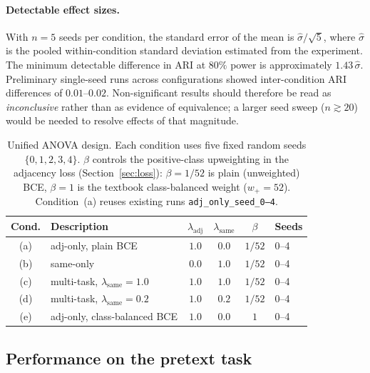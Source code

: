 \documentclass[12pt, a4paper]{article}
\begin{document}
\paragraph{Detectable effect sizes.}
With $n = 5$ seeds per condition, the standard error of the mean is
$\hat{\sigma}/\!\sqrt{5}$, where $\hat{\sigma}$ is the pooled within-condition
standard deviation estimated from the experiment.
The minimum detectable difference in ARI at $80\%$ power is approximately
$1.43\,\hat{\sigma}$.
Preliminary single-seed runs across configurations showed inter-condition
ARI differences of $0.01$--$0.02$. Non-significant results should therefore
be read as \emph{inconclusive} rather than as evidence of equivalence; a
larger seed sweep ($n \gtrsim 20$) would be needed to resolve effects of
that magnitude.

\begin{table}[h]
\centering
\begin{tabular}{clcccl}
\toprule
\textbf{Cond.} & \textbf{Description} & $\lambda_{\text{adj}}$ & $\lambda_{\text{same}}$ & $\beta$ & \textbf{Seeds} \\
\midrule
(a) & adj-only, plain BCE                      & $1.0$ & $0.0$ & $1/52$ & 0--4 \\
(b) & same-only                                & $0.0$ & $1.0$ & $1/52$ & 0--4 \\
(c) & multi-task, $\lambda_{\text{same}}=1.0$  & $1.0$ & $1.0$ & $1/52$ & 0--4 \\
(d) & multi-task, $\lambda_{\text{same}}=0.2$  & $1.0$ & $0.2$ & $1/52$ & 0--4 \\
(e) & adj-only, class-balanced BCE             & $1.0$ & $0.0$ & $1$    & 0--4 \\
\bottomrule
\end{tabular}
\caption{Unified ANOVA design. Each condition uses five fixed random seeds $\{0,1,2,3,4\}$.
$\beta$ controls the positive-class upweighting in the adjacency loss
(Section~\ref{sec:loss}): $\beta = 1/52$ is plain (unweighted) BCE,
$\beta = 1$ is the textbook class-balanced weight ($w_{+} = 52$).
Condition~(a) reuses existing runs \texttt{adj\_only\_seed\_0--4}.}
\label{tab:anova-design}
\end{table}

\subsection{Performance on the pretext task}
\end{document}
